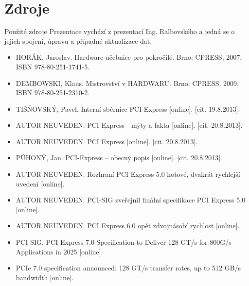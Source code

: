 \documentclass[aspectratio=43]{beamer}
\begin{document}
\section{Zdroje}
\begin{frame}{Použité zdroje}
    Prezentace vychází z prezentací Ing. Ralbovského a jedná se o jejich spojení, úpravu a případné aktualizace dat.
    \scriptsize
    \begin{itemize}
        \item HORÁK, Jaroslav. Hardware učebnice pro pokročilé. Brno: CPRESS, 2007, ISBN 978-80-251-1741-5.
        \item DEMBOWSKI, Klaus. Mistrovství v HARDWARU. Brno: CPRESS, 2009, ISBN 978-80-251-2310-2.
        \item TIŠŇOVSKÝ, Pavel. Interní sběrnice PCI Express [online]. [cit. 19.8.2013].
        \item AUTOR NEUVEDEN. PCI Express - mýty a fakta [online]. [cit. 20.8.2013].
        \item AUTOR NEUVEDEN. PCI Express [online]. [cit. 20.8.2013].
        \item PŮHONÝ, Jan. PCI-Express – obecný popis [online]. [cit. 20.8.2013].
        \item AUTOR NEUVEDEN. Rozhraní PCI Express 5.0 hotové, dvakrát rychlejší uvedení [online].
        \item AUTOR NEUVEDEN. PCI-SIG zveřejnil finální specifikace PCI Express 5.0 [online].
        \item AUTOR NEUVEDEN. PCI Express 6.0 opět zdvojnásobí rychlost [online].
        \item PCI-SIG. PCI Express 7.0 Specification to Deliver 128 GT/s for 800G/s Applications in 2025 [online].
        \item PCIe 7.0 specification announced: 128 GT/s transfer rates, up to 512 GB/s bandwidth [online].
    \end{itemize}
\end{frame}
\end{document}
